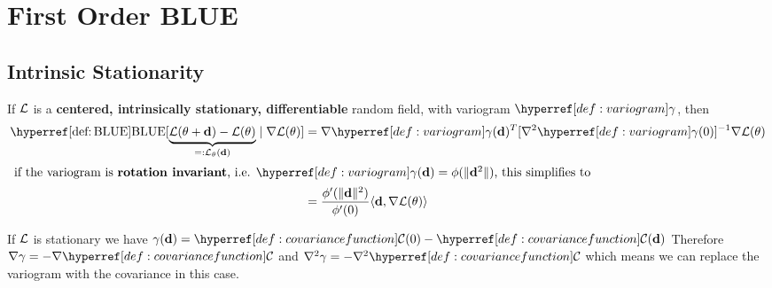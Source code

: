 \section{First Order BLUE}

\subsection{Intrinsic Stationarity}

\begin{lemma}\label{lem: blue centered, intrinsically stationary}
	If \(\mathcal{L}\) is a \textbf{centered, intrinsically stationary, differentiable}
	random field, with variogram \(\variogram\), then
	\begin{align*}
		\BLUE[\underbrace{\Loss(\param+\step) - \Loss(\param)}_{=:\Loss_\param(\step)}
		\mid \grad\Loss(\param)]
		&=  \grad\variogram(\step)^T[\grad^2\variogram(0)]^{-1}
		\grad\Loss(\param)\\
		\intertext{
			if the variogram is \textbf{rotation invariant}, i.e.
			\(\variogram(\step)=\phi(\|\step^2\|)\), this simplifies to
		}
		&= \frac{\phi'(\|\step\|^2)}{\phi'(0)}
		\langle \step, \grad\Loss(\param)\rangle
	\end{align*}
\end{lemma}
\begin{remark}
	If \(\mathcal{L}\) is stationary we have \(\gamma(\step) = \C(0) - \C(\step)\)
	Therefore \(\grad\gamma = - \grad\C\) and \(\grad^2\gamma = -\grad^2\C\)
	which means we can replace the variogram with the covariance in this case.
\end{remark}


